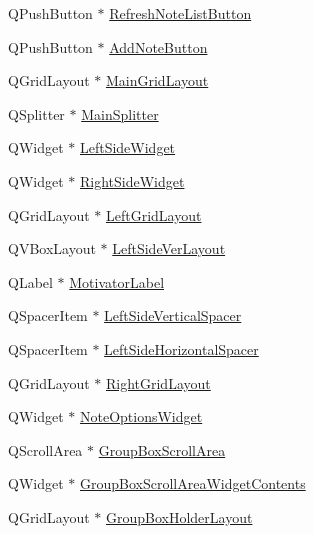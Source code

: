 \begin{DoxyCompactItemize}
\item 
Q\+Push\+Button $\ast$ \hyperlink{classMattyNotesMainWindow_acbbcc35de95ac20e40222e05d18c4c18}{Refresh\+Note\+List\+Button}
\item 
Q\+Push\+Button $\ast$ \hyperlink{classMattyNotesMainWindow_aeb4fd769ffeac425a43abc16708b6dc1}{Add\+Note\+Button}
\item 
Q\+Grid\+Layout $\ast$ \hyperlink{classMattyNotesMainWindow_a8d6b99e6a4b055ac1e27bcced0dbdbcf}{Main\+Grid\+Layout}
\item 
Q\+Splitter $\ast$ \hyperlink{classMattyNotesMainWindow_a23bccec30dacb989e0e86c20e3afd037}{Main\+Splitter}
\item 
Q\+Widget $\ast$ \hyperlink{classMattyNotesMainWindow_adc593268179cbf4d75170b3b3ce02843}{Left\+Side\+Widget}
\item 
Q\+Widget $\ast$ \hyperlink{classMattyNotesMainWindow_a996c73ff73f44e875ce48192db687abb}{Right\+Side\+Widget}
\item 
Q\+Grid\+Layout $\ast$ \hyperlink{classMattyNotesMainWindow_aaba04f791304a6ccca1c96bef35b52d6}{Left\+Grid\+Layout}
\item 
Q\+V\+Box\+Layout $\ast$ \hyperlink{classMattyNotesMainWindow_a4f9dc9be365bc7f2565f0c50c9a11be5}{Left\+Side\+Ver\+Layout}
\item 
Q\+Label $\ast$ \hyperlink{classMattyNotesMainWindow_ad4910860415073b4d8c59190807800ba}{Motivator\+Label}
\item 
Q\+Spacer\+Item $\ast$ \hyperlink{classMattyNotesMainWindow_ab70a06df9c479aa5e6d0a3e8f8b266e1}{Left\+Side\+Vertical\+Spacer}
\item 
Q\+Spacer\+Item $\ast$ \hyperlink{classMattyNotesMainWindow_ae4d4ea6fec42e10eab167f457116fdf0}{Left\+Side\+Horizontal\+Spacer}
\item 
Q\+Grid\+Layout $\ast$ \hyperlink{classMattyNotesMainWindow_af5caef9487e095083f52c4989e1af926}{Right\+Grid\+Layout}
\item 
Q\+Widget $\ast$ \hyperlink{classMattyNotesMainWindow_aa98524af7077eef16ba0529e5175f994}{Note\+Options\+Widget}
\item 
Q\+Scroll\+Area $\ast$ \hyperlink{classMattyNotesMainWindow_a86b43b5faf9df668013aa95be9be54f5}{Group\+Box\+Scroll\+Area}
\item 
Q\+Widget $\ast$ \hyperlink{classMattyNotesMainWindow_aa494ff6b293445e08b9a706938536450}{Group\+Box\+Scroll\+Area\+Widget\+Contents}
\item 
Q\+Grid\+Layout $\ast$ \hyperlink{classMattyNotesMainWindow_ad0fc70c3a6eb0d3ac31518dd7350d21c}{Group\+Box\+Holder\+Layout}

\end{DoxyCompactItemize}

